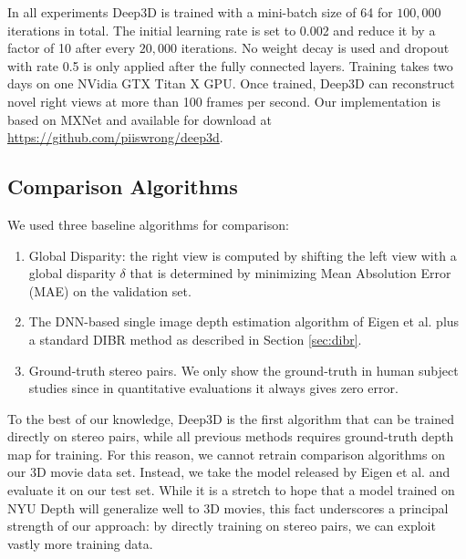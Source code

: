 \documentclass[runningheads]{llncs}
\begin{document}
In all experiments Deep3D is trained with a mini-batch size of 64 for $100,000$ iterations in total.
The initial learning rate is set to 0.002 and reduce it by a factor of 10 after every $20,000$ iterations.
No weight decay is used
and dropout with rate 0.5 is only applied after the fully connected layers.
Training takes two days on one NVidia GTX Titan X GPU.
Once trained, Deep3D can reconstruct novel right views at more than 100 frames per second.
Our implementation is based on MXNet \cite{chen2015mxnet} and available for download at \url{https://github.com/piiswrong/deep3d}.

\subsection{Comparison Algorithms}
We used three baseline algorithms for comparison:
\begin{enumerate}
\item Global Disparity: the right view is computed by shifting the left view with a global disparity $\delta$ that is determined by minimizing Mean Absolution Error (MAE) on the validation set.
\item The DNN-based single image depth estimation algorithm of Eigen et al. \cite{eigen2014depth} plus a standard DIBR method as described in Section \ref{sec:dibr}.
\item Ground-truth stereo pairs. We only show the ground-truth in human subject studies since in quantitative evaluations it always gives zero error.
\end{enumerate}

To the best of our knowledge, Deep3D is the first algorithm that can be trained directly on stereo pairs,
while all previous methods requires ground-truth depth map for training.
For this reason, we cannot retrain comparison algorithms on our 3D movie data set.
Instead, we take the model released by Eigen et al. \cite{eigen2014depth} and evaluate it on our test set.
While it is a stretch to hope that a model trained on NYU Depth will generalize well to 3D movies, this fact underscores a principal strength of our approach: by directly training on stereo pairs, we can exploit vastly more training data.
\end{document}
